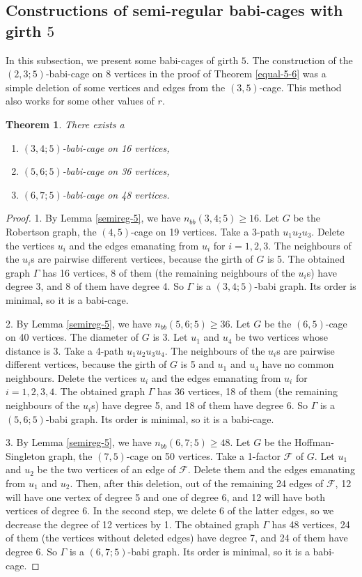 \documentclass[a4paper,11pt]{article}
\newtheorem{theorem}{Theorem}[section]
\begin{document}
\subsection{Constructions of semi-regular babi-cages with girth $5$}

In this subsection, we present some babi-cages of girth $5.$ The construction of the $(2,3;5)$-babi-cage on 8 vertices in the proof of Theorem \ref{equal-5-6} was a simple deletion of some vertices and edges from the $(3,5)$-cage. This method also works for some other values of $r$. 

\begin{theorem}
There exists a
\begin{enumerate}
\item
$(3,4;5)$-babi-cage on 16 vertices,
\item 
$(5,6;5)$-babi-cage on 36 vertices,
\item 
$(6,7;5)$-babi-cage on 48 vertices.
\end{enumerate}
\end{theorem}

\begin{proof}
1. By Lemma \ref{semireg-5}, we have $n_{bb}(3,4;5)\geq 16.$
Let $G$ be the Robertson graph, the $(4,5)$-cage on 19 vertices. Take a 3-path $u_1u_2u_3$. Delete the vertices $u_i$ and the edges emanating from $u_i$ for $i=1,2,3.$ The neighbours of
the $u_i$s are pairwise different vertices, because the girth of $G$ is 5. 
The obtained graph $\Gamma $ has 16 vertices, 8 of them (the
remaining neighbours of the $u_i$s) have degree 3, and 8 of them have degree 4.
So $\Gamma $ is a $(3,4;5)$-babi graph. Its order is minimal, so it is a babi-cage.

2. By Lemma \ref{semireg-5}, we have $n_{bb}(5,6;5)\geq 36.$
Let $G$ be the $(6,5)$-cage on 40 vertices. The diameter of $G$ is 3. Let $u_1$ and $u_4$ be two vertices whose distance is 3. Take a 4-path $u_1u_2u_3u_4$. The neighbours of
the $u_i$s are pairwise different vertices, because the girth of $G$ is 5 and $u_1$ and $u_4$ have no
common neighbours. Delete the vertices $u_i$ and the edges emanating from $u_i$ for $i=1,2,3,4.$ The obtained graph $\Gamma $ has 36 vertices, 18 of them (the
remaining neighbours of the $u_i$s) have degree 5, and 18 of them have degree 6.
So $\Gamma $ is a $(5,6;5)$-babi graph. Its order is minimal, so it is a babi-cage.

3.  By Lemma \ref{semireg-5}, we have $n_{bb}(6,7;5)\geq 48.$
Let $G$ be the Hoffman-Singleton graph, the $(7,5)$-cage on 50 vertices. Take a 1-factor
$\mathcal{F}$ of $G.$ Let $u_1$ and $u_2$ be the two vertices of an edge of $\mathcal{F}$. Delete them and the edges emanating from $u_1$ and $u_2$. 
Then, after this deletion, out of the remaining 24 edges of $\mathcal{F}$, 12 will have one vertex of degree 5 and one of degree 6, and 12 will have both vertices of degree 6. In the second step, we delete 6 of the latter edges, so we decrease the degree of 12 vertices by 1. The obtained graph $\Gamma $ has 48 vertices, 24 of them (the vertices without deleted edges) have degree 7, and 24 of them have degree 6. So $\Gamma $ is a $(6,7;5)$-babi graph. Its order is minimal, so it is a babi-cage.
 \end{proof}
\end{document}
